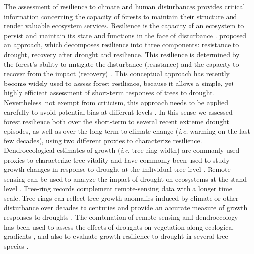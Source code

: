 The assessment of resilience to climate and human disturbances provides critical information concerning the capacity of forests to maintain their structure and render valuable ecosystem services. Resilience is the capacity of an ecosystem to persist and maintain its state and functions in the face of disturbance \autocite{Holling1973ResilienceStability,Hodgsonetal2015WhatYou}. \textcite{Lloretetal2011ComponentsTree} proposed an approach, which decomposes resilience into three components: resistance to drought, recovery after drought and resilience. This resilience is determined by the forest's ability to mitigate the disturbance (resistance) and the capacity to recover from the impact (recovery) \autocite{IngrischBahn2018ComparableQuantification}. This conceptual approach has recently become widely used to assess forest resilience, because it allows a simple, yet highly efficient assessment of short-term responses of trees to drought. Nevertheless, not exempt from criticism, this approach needs to be applied carefully to avoid potential bias at different levels \autocite{Schwarzetal2020QuantifyingGrowth}. In this sense we assessed forest resilience both over the short-term to several recent extreme drought episodes, as well as over the long-term to climate change (\emph{i.e.} warming on the last few decades), using two different proxies to characterize resilience. Dendroecological estimates of growth (\emph{i.e.} tree-ring width) are commonly used proxies to characterize tree vitality and have commonly been used to study growth changes in response to drought at the individual tree level \autocite{Fritts1976TreeRings,Dobbertin2005TreeGrowth}. Remote sensing can be used to analyze the impact of drought on ecosystems at the stand level \autocite[\emph{e.g.}][]{Zhangetal2013MonitoringEstimating}. Tree-ring records complement remote-sensing data with a longer time scale. Tree rings can reflect tree-growth anomalies induced by climate or other disturbance over decades to centuries \autocite{Babstetal2017ImprovedTreering} and provide an accurate measure of growth responses to droughts \autocite{Bhuyanetal2017DifferentResponses}. The combination of remote sensing and dendroecology has been used to assess the effects of droughts on vegetation along ecological gradients \autocites[\emph{e.g.}][]{VicenteSerranoetal2013ResponseVegetation,Coulthardetal2017TreeGrowth}, and also to evaluate growth resilience to drought in several tree species \autocites[\emph{e.g.}][]{Gazoletal2018ForestResilience,PenaGallardoetal2018DroughtSensitiveness}.

